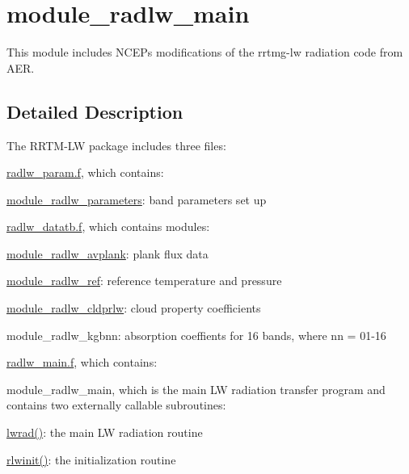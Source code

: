 \hypertarget{group__module__radlw__main}{}\section{module\+\_\+radlw\+\_\+main}
\label{group__module__radlw__main}


This module includes N\+C\+EP\textquotesingle{}s modifications of the rrtmg-\/lw radiation code from A\+ER.  




\subsection{Detailed Description}
The R\+R\+T\+M-\/\+LW package includes three files\+:
\begin{DoxyItemize}
\item \hyperlink{radlw__param_8f}{radlw\+\_\+param.\+f}, which contains\+:
\begin{DoxyItemize}
\item \hyperlink{namespacemodule__radlw__parameters}{module\+\_\+radlw\+\_\+parameters}\+: band parameters set up
\end{DoxyItemize}
\item \hyperlink{radlw__datatb_8f}{radlw\+\_\+datatb.\+f}, which contains modules\+:
\begin{DoxyItemize}
\item \hyperlink{namespacemodule__radlw__avplank}{module\+\_\+radlw\+\_\+avplank}\+: plank flux data
\item \hyperlink{namespacemodule__radlw__ref}{module\+\_\+radlw\+\_\+ref}\+: reference temperature and pressure
\item \hyperlink{namespacemodule__radlw__cldprlw}{module\+\_\+radlw\+\_\+cldprlw}\+: cloud property coefficients
\item module\+\_\+radlw\+\_\+kgbnn\+: absorption coeffients for 16 bands, where nn = 01-\/16
\end{DoxyItemize}
\item \hyperlink{radlw__main_8f}{radlw\+\_\+main.\+f}, which contains\+:
\begin{DoxyItemize}
\item module\+\_\+radlw\+\_\+main, which is the main LW radiation transfer program and contains two externally callable subroutines\+:
\begin{DoxyItemize}
\item \hyperlink{group__module__radlw__main_gaf20db29eaadab298ccd8b6bf489a53f4}{lwrad()}\+: the main LW radiation routine
\item \hyperlink{group__module__radlw__main_gaa9569479682c83b26584b7e9ee6841fa}{rlwinit()}\+: the initialization routine
\end{DoxyItemize}
\end{DoxyItemize}
\end{DoxyItemize}

